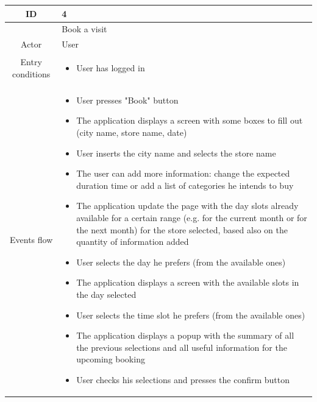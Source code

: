 \documentclass[table, 12pt]{article}
\begin{document}
\begin{longtable}{|c| p{10cm}|}
    \hline ID        & 4                                                                                                                                            \\
    \hline
                     & Book a visit                                                                                                                                 \\
    \hline
    Actor            & User                                                                                                                                         \\
    \hline
    Entry conditions & \begin{itemize}
        \item User has logged in
    \end{itemize}                                                                                                                   \\
    \hline
    Events flow      & \begin{itemize}[nosep,after=\strut]
        \item User presses "Book" button
        \item The application displays a screen with some boxes to fill out (city name, store name, date)
        \item User inserts the city name and selects the store name
        \item The user can add more information: change the expected duration time or add a list of categories he intends to buy
        \item The application update the page with the day slots already available for a certain range (e.g. for the current month or for the next month) for the store selected, based also on the quantity of information added
        \item User selects the day he prefers (from the available ones)
        \item The application displays a screen with the available slots in the day selected
        \item User selects the time slot he prefers (from the available ones)
        \item The application displays a popup with the summary of all the previous selections and all useful information for the upcoming booking
        \item User checks his selections and presses the confirm button

\end{itemize}
\end{longtable}
\end{document}
